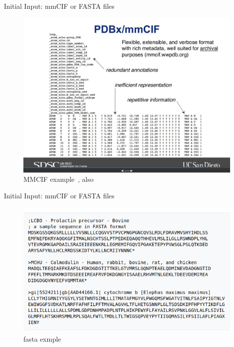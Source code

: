 \documentclass[presentation, smaller]{beamer}
\begin{document}
\begin{frame}[label={sec:org5532c53}]{Initial Input: mmCIF or FASTA files}
  \begin{center}
    \begin{figure}
      \includegraphics[height=.8\textheight]{./imgs/mmcif-eg.png}
      \caption{MMCIF example~\cite{jumperHighlyAccurateProtein2021}, also~\cite{PDB101LearnGuide}}
      \label{fig:mmcif}
    \end{figure}
  \end{center}
\end{frame}


\begin{frame}[label={sec:orgae2d480}]{Initial Input: mmCIF or FASTA files}
\begin{center}
  \begin{figure}
    \includegraphics[width=.9\linewidth]{./imgs/fastafiles_2021-07-20.png}
    \caption{fasta exmple~\cite{jumperHighlyAccurateProtein2021}}
    \label{fig:}
  \end{figure}
\end{center}
\end{frame}
\end{document}
